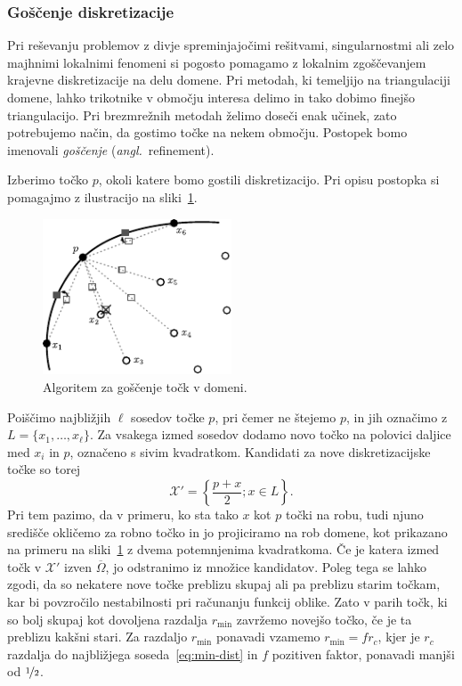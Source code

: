 \documentclass[12pt,a4paper,twoside]{article}
\theoremstyle{definition} %
\theoremstyle{plain} %
\numberwithin{equation}{section}
\newcommand{\X}{\mathcal{X}}
\newcommand{\zomega}{\overline{\Omega}}
\newcommand{\ang}[1]{(\hspace{-1.5px}\textit{angl.}\ #1)}
\begin{document}
\subsubsection{Goščenje diskretizacije}
\label{sec:goscenje}
Pri reševanju problemov z divje spreminjajočimi rešitvami, singularnostmi ali zelo majhnimi
lokalnimi fenomeni si pogosto pomagamo z lokalnim zgoščevanjem krajevne diskretizacije na delu
domene. Pri metodah, ki temeljijo na triangulaciji domene, lahko
trikotnike v območju interesa delimo in tako dobimo finejšo triangulacijo. Pri brezmrežnih
metodah želimo doseči enak učinek, zato potrebujemo način, da gostimo točke na nekem območju.
Postopek bomo imenovali \emph{goščenje} \ang{refinement}.

Izberimo točko $p$, okoli katere bomo gostili diskretizacijo. Pri opisu postopka si pomagajmo z
ilustracijo na sliki~\ref{fig:refine-algorithm}.
\begin{figure}[h]
  \centering
  \includegraphics[width=0.5\textwidth]{images/domain_refine.pdf}
  \caption{Algoritem za goščenje točk v domeni.}
  \label{fig:refine-algorithm}
\end{figure}
Poiščimo najbližjih $\ell$ sosedov točke $p$, pri čemer ne štejemo $p$, in jih označimo z $L = \{x_1,
\dots, x_\ell\}$. Za vsakega izmed sosedov dodamo novo točko na polovici daljice med $x_i$ in $p$,
označeno s sivim kvadratkom. Kandidati za nove diskretizacijske točke so torej
\begin{equation}
   \X' = \left\{ \frac{p+x}{2}; x \in L \right\}.
\end{equation}
Pri tem pazimo, da v primeru, ko sta tako $x$ kot $p$ točki na robu, tudi njuno središče okličemo
za robno točko in jo projiciramo na rob domene, kot prikazano na primeru na
sliki~\ref{fig:refine-algorithm} z dvema potemnjenima kvadratkoma. Če je katera izmed točk v $\X'$
izven $\zomega$, jo odstranimo iz množice kandidatov. Poleg tega se lahko zgodi, da so nekatere nove
točke preblizu skupaj ali pa preblizu starim točkam, kar bi povzročilo nestabilnosti pri računanju
funkcij oblike. Zato v parih točk, ki so bolj skupaj kot dovoljena razdalja $r_{\text{min}}$
zavržemo novejšo točko, če je ta preblizu kakšni stari. Za razdaljo $r_\text{min}$ ponavadi vzamemo
$r_\text{min} = f r_c$, kjer je $r_c$ razdalja do najbližjega soseda~\eqref{eq:min-dist} in $f$
pozitiven faktor, ponavadi manjši od $\nicefrac{1}{2}$.
\end{document}
